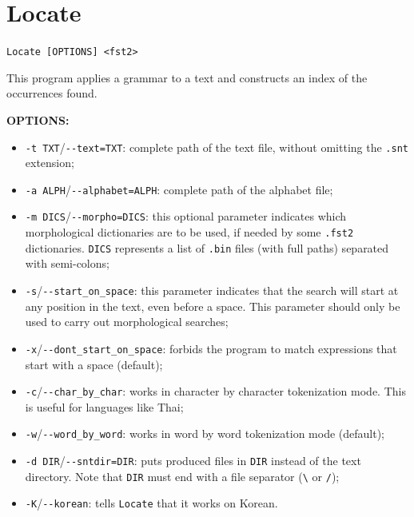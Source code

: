 \section{Locate}
\verb+Locate [OPTIONS] <fst2>+

\bigskip
\noindent {}
This program applies a grammar to a text and constructs an index of the
occurrences found.

\bigskip
\noindent \textbf{OPTIONS:}
\begin{itemize}
  \item \verb+-t TXT+/\verb+--text=TXT+: complete path of the text file, without omitting
  the \verb+.snt+ extension;

  \item \verb+-a ALPH+/\verb+--alphabet=ALPH+: complete path of the alphabet
  file;
  
  \item \verb+-m DICS+/\verb+--morpho=DICS+: this optional parameter indicates
  which morphological dictionaries are to be used, if needed by some \verb+.fst2+
  dictionaries. \verb+DICS+ represents a list of \verb+.bin+ files (with full
  paths) separated with semi-colons;
  
  \item \verb+-s+/\verb+--start_on_space+: this parameter indicates that the
  search will start at any position in the text, even before a space. This 
  parameter should only be used to carry out morphological searches;
  
  \item \verb+-x+/\verb+--dont_start_on_space+: forbids the program to match
  expressions that start with a space (default);
  
  \item \verb+-c+/\verb+--char_by_char+: works in character by character
  tokenization mode. This is useful for languages like Thai;
  
  \item \verb+-w+/\verb+--word_by_word+: works in word by word
  tokenization mode (default);
  
  \item \verb+-d DIR+/\verb+--sntdir=DIR+: puts produced files in \verb+DIR+
  instead of the text directory. Note that \verb+DIR+ must end with a file separator
  (\verb+\+ or \verb+/+);
  
  \item \verb+-K+/\verb+--korean+: tells \verb+Locate+ that it works on Korean.
  
\end{itemize}

